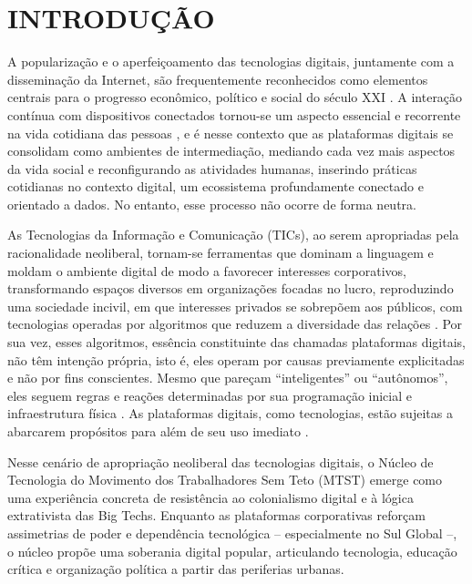 




\chapter{INTRODUÇÃO}
\label{chap:introducao}

A popularização e o aperfeiçoamento das tecnologias digitais, juntamente com a disseminação da Internet, são frequentemente reconhecidos como elementos centrais para o progresso econômico, político e social do século XXI \cite{Silveira2021}. A interação contínua com dispositivos conectados tornou-se um aspecto essencial e recorrente na vida cotidiana das pessoas \cite{silveira-demcodigos}, e é nesse contexto que as plataformas digitais se consolidam como ambientes de intermediação, mediando cada vez mais aspectos da vida social e reconfigurando as atividades humanas, inserindo práticas cotidianas no contexto digital, um ecossistema profundamente conectado e orientado a dados. No entanto, esse processo não ocorre de forma neutra. 

As Tecnologias da Informação e Comunicação (TICs), ao serem apropriadas pela racionalidade neoliberal, tornam-se ferramentas que dominam a linguagem e moldam o ambiente digital de modo a favorecer interesses corporativos, transformando espaços diversos em organizações focadas no lucro, reproduzindo uma sociedade incivil, em que interesses privados se sobrepõem aos públicos, com tecnologias operadas por algoritmos que reduzem a diversidade das relações \cite{souza_sabbag_achilles_2024}. Por sua vez, esses algoritmos, essência constituinte das chamadas plataformas digitais, não têm intenção própria, isto é, eles operam por causas previamente explicitadas e não por fins conscientes. Mesmo que pareçam “inteligentes” ou “autônomos”, eles seguem regras e reações determinadas por sua programação inicial e infraestrutura física \cite{Faustino2023}. As plataformas digitais, como tecnologias, estão sujeitas a abarcarem propósitos para além de seu uso imediato \cite{Winner_2019}.

Nesse cenário de apropriação neoliberal das tecnologias digitais, o Núcleo de Tecnologia do Movimento dos Trabalhadores Sem Teto (MTST) emerge como uma experiência concreta de resistência ao colonialismo digital e à lógica extrativista das Big Techs. Enquanto as plataformas corporativas reforçam assimetrias de poder e dependência tecnológica – especialmente no Sul Global –, o núcleo propõe uma soberania digital popular, articulando tecnologia, educação crítica e organização política a partir das periferias urbanas.


